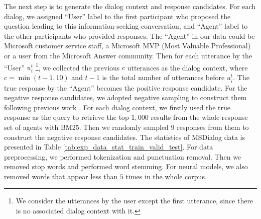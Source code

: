   The next step is to generate the dialog context and response candidates. For each dialog, we assigned ``User'' label to the first participant who proposed the question leading to this information-seeking conversation, and ``Agent'' label to the other participants who provided responses. The ``Agent'' in our data could be Microsoft customer service staff, a Microsoft MVP (Most Valuable Professional) or a user from the Microsoft Answer community. Then for each utterance by the ``User'' $u_i^t$ \footnote{We consider the utterances by the user except the first utterance, since there is no associated dialog context with it. }, we collected the previous $c$ utterances as the dialog context, where $c = \min(t-1,10)$ and $t-1$ is the total number of utterances before $u_i^t$. The true response by the ``Agent'' becomes the positive response candidate. For the negative response candidates, we adopted negative sampling to construct them following previous work \cite{DBLP:conf/aaai/WanLGXPC16,DBLP:journals/corr/LowePSP15,DBLP:conf/acl/WuWXZL17}. For each dialog context, we firstly used the true response as the query to retrieve the top $1,000$ results from the whole response set of agents with BM25. Then we randomly sampled $9$ responses from them to construct the negative response candidates. The statistics of MSDialog data is presented in Table \ref{tab:exp_data_stat_train_valid_test}. For data preprocessing, we performed tokenization and punctuation removal. Then we removed stop words and performed word stemming. For neural models, we also removed words that appear less than $5$ times in the whole corpus. 
  
